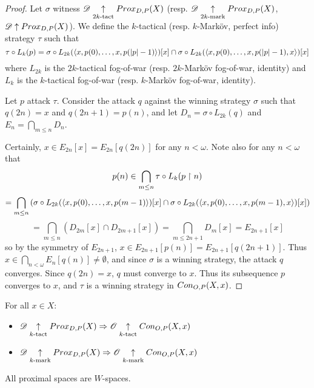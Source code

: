 \begin{proof}
Let $\sigma$ witness $\mathscr{D} \underset{2k\text{-tact}}{\uparrow}Prox_{D,P}(X)$ (resp. $\mathscr{D} \underset{2k\text{-mark}}{\uparrow}Prox_{D,P}(X)$, $\mathscr{D}\uparrow Prox_{D,P}(X)$). We define the $k$-tactical (resp. $k$-Mark\"ov, perfect info) strategy $\tau$ such that
  \[
    \tau\circ L_k(p)
      =
    \sigma\circ L_{2k}(\langle x,p(0),\dots,x,p(|p|-1)\rangle)[x]
      \cap
    \sigma\circ L_{2k}(\langle x,p(0),\dots,x,p(|p|-1),x\rangle)[x]
  \]
where $L_{2k}$ is the $2k$-tactical fog-of-war (resp. $2k$-Mark\"ov fog-of-war, identity) and $L_{k}$ is the $k$-tactical fog-of-war (resp. $k$-Mark\"ov fog-of-war, identity).

Let $p$ attack $\tau$. Consider the attack $q$ against the winning strategy $\sigma$ such that $q(2n)=x$ and $q(2n+1)=p(n)$, and let $D_n=\sigma\circ L_{2k}(q)$ and $E_n=\bigcap_{m\leq n}D_n$.

Certainly, $x\in E_{2n}[x]= E_{2n}[q(2n)]$ for any $n<\omega$. Note also for any $n<\omega$ that 
    \[
      p(n) \in 
      \bigcap_{m\leq n}\tau\circ L_k(p\restriction n)
    \]
    \[
      =
      \bigcap_{m\leq n}\left(
        \sigma\circ L_{2k}(\langle x,p(0),\dots,x,p(m-1)\rangle)[x]\cap
        \sigma\circ L_{2k}(\langle x,p(0),\dots,x,p(m-1),x\rangle)[x]
      \right)
    \]
    \[
      =
      \bigcap_{m\leq n}\left(
        D_{2m}[x]\cap
        D_{2m+1}[x]
      \right) =
      \bigcap_{m\leq 2n+1} D_m[x]=E_{2n+1}[x]
    \]
so by the symmetry of $E_{2n+1}$, $x\in E_{2n+1}[p(n)]= E_{2n+1}[q(2n+1)]$. Thus $x\in \bigcap_{n<\omega} E_n[q(n)]\not=\emptyset$, and since $\sigma$ is a winning strategy, the attack $q$ converges. Since $q(2n)=x$, $q$ must converge to $x$. Thus its subsequence $p$ converges to $x$, and $\tau$ is a winning strategy in $Con_{O,P}(X,x)$.
\end{proof}

\begin{corollary}
For all $x\in X$:
  \begin{itemize}
    \item
      $\mathscr{D}\underset{k\text{-tact}}{\uparrow} Prox_{D,P}(X) \Rightarrow \mathscr{O} \underset{k\text{-tact}}{\uparrow} Con_{O,P}(X,x)$
    \item
      $\mathscr{D}\underset{k\text{-mark}}{\uparrow} Prox_{D,P}(X) \Rightarrow \mathscr{O} \underset{k\text{-mark}}{\uparrow} Con_{O,P}(X,x)$
  \end{itemize}
\end{corollary}

\begin{corollary}
  All proximal spaces are $W$-spaces.
\end{corollary}

